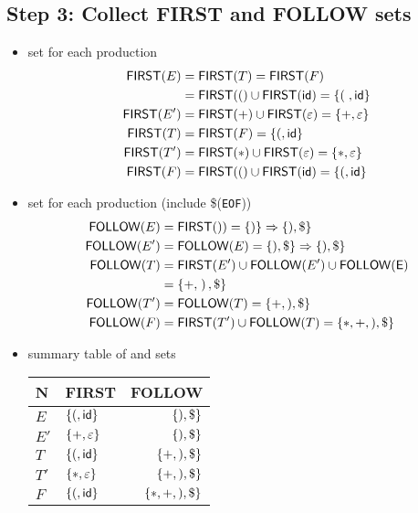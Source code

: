 \documentclass[10pt,a4paper,landscape]{article}
\begin{document}
\begin{multicols*}{3}
\section*{Step 3: Collect FIRST and FOLLOW sets}
\begin{itemize}
\item {} set for each production
  \begin{align*}
    \mfn{first}(E)  &= \mfn{first}(T) = \mfn{first}(F) \\
                    &= \mfn{first}(() \cup \mfn{first}(\mathsf{id})
                      = \mset{\left(\right.,\mathsf{id}} \\
    \mfn{first}(E') &= \mfn{first}(+)\cup\mfn{first}(\varepsilon)
                      = \mset{+,\varepsilon}                  \\
    \mfn{first}(T)  &= \mfn{first}(F) = \mset{(,\mathsf{id}}  \\
    \mfn{first}(T') &= \mfn{first}(*)\cup\mfn{first}(\varepsilon)
                      = \mset{*,\varepsilon}  \\
    \mfn{first}(F)  &= \mfn{first}(()\cup\mfn{first}(\mathsf{id})
                      = \mset{(,\mathsf{id}}
  \end{align*}
\item {} set for each production (include \$(\texttt{EOF}))
  \begin{align*}
    \mfn{follow}(E)  &= \mfn{first}()) = \mset{)} \Rightarrow \mset{), \$}     \\
    \mfn{follow}(E') &= \mfn{follow}(E) = \mset{), \$} \Rightarrow \mset{), \$}\\
    \mfn{follow}(T)  &= \mfn{first}(E')\cup\mfn{follow}(E')\cup\mfn{follow(E)} \\
                     &= \mset{+, \left.\right), \$} \\
    \mfn{follow}(T') &= \mfn{follow}(T) = \mset{+, ), \$}\\
    \mfn{follow}(F)  &= \mfn{first}(T')\cup\mfn{follow}(T)= \mset{*, +, ), \$}
    \end{align*}
  \item summary table of  and  sets
    \begin{center}
      \begin{tabular}{l|l|r}
        \hline
        N  & \textsf{FIRST} & \textsf{FOLLOW} \\
        \hline
        \(E\)   & \(\{(,\mathsf{id}\}\) & \(\{), \$\}\) \\
        \(E'\)  & \(\{+,\varepsilon\}\) & \(\{), \$\}\) \\
        \(T\)   & \(\{(,\mathsf{id}\}\) & \(\{+, ), \$\}\) \\
        \(T'\)  & \(\{*,\varepsilon\}\) & \(\{+, ), \$\}\) \\
        \(F\)   & \(\{(,\mathsf{id}\}\) & \(\{*, +, ), \$\}\) \\
        \hline
      \end{tabular}
  \end{center}
\end{itemize}



\end{multicols*}
\end{document}
